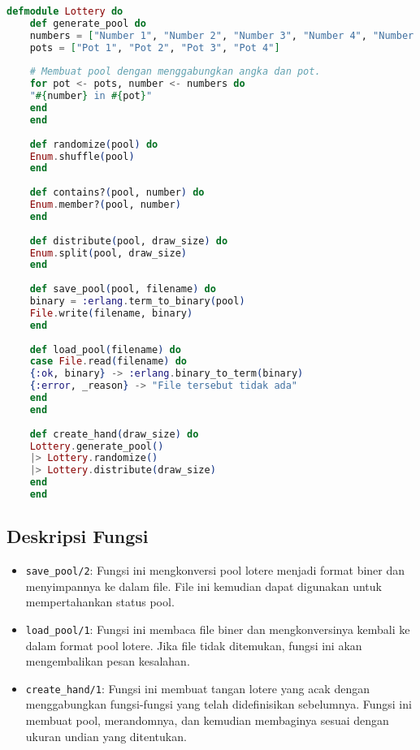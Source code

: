 \begin{lstlisting}[language=Elixir]
	defmodule Lottery do
	def generate_pool do
	numbers = ["Number 1", "Number 2", "Number 3", "Number 4", "Number 5"]
	pots = ["Pot 1", "Pot 2", "Pot 3", "Pot 4"]
	
	# Membuat pool dengan menggabungkan angka dan pot.
	for pot <- pots, number <- numbers do
	"#{number} in #{pot}"
	end
	end
	
	def randomize(pool) do
	Enum.shuffle(pool)
	end
	
	def contains?(pool, number) do
	Enum.member?(pool, number)
	end
	
	def distribute(pool, draw_size) do
	Enum.split(pool, draw_size)
	end
	
	def save_pool(pool, filename) do
	binary = :erlang.term_to_binary(pool)
	File.write(filename, binary)
	end
	
	def load_pool(filename) do
	case File.read(filename) do
	{:ok, binary} -> :erlang.binary_to_term(binary)
	{:error, _reason} -> "File tersebut tidak ada"
	end
	end
	
	def create_hand(draw_size) do
	Lottery.generate_pool()
	|> Lottery.randomize()
	|> Lottery.distribute(draw_size)
	end
	end
\end{lstlisting}

\subsection{Deskripsi Fungsi}

\begin{itemize}
	\item \texttt{save\_pool/2}: Fungsi ini mengkonversi pool lotere menjadi format biner dan menyimpannya ke dalam file. File ini kemudian dapat digunakan untuk mempertahankan status pool.
	\item \texttt{load\_pool/1}: Fungsi ini membaca file biner dan mengkonversinya kembali ke dalam format pool lotere. Jika file tidak ditemukan, fungsi ini akan mengembalikan pesan kesalahan.
	\item \texttt{create\_hand/1}: Fungsi ini membuat tangan lotere yang acak dengan menggabungkan fungsi-fungsi yang telah didefinisikan sebelumnya. Fungsi ini membuat pool, merandomnya, dan kemudian membaginya sesuai dengan ukuran undian yang ditentukan.
\end{itemize}

